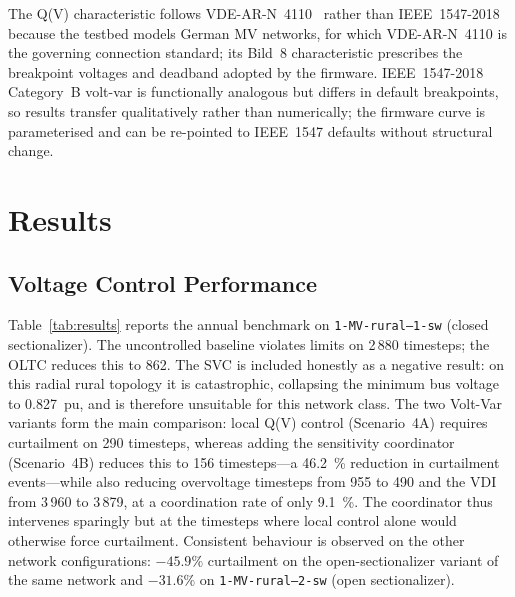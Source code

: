 \documentclass[conference]{IEEEtran}
\begin{document}
The Q(V) characteristic follows VDE-AR-N~4110~\cite{vde4110} rather than
IEEE~1547-2018~\cite{ieee1547} because the testbed models German MV
networks, for which VDE-AR-N~4110 is the governing connection standard;
its Bild~8 characteristic prescribes the breakpoint voltages and
deadband adopted by the firmware. IEEE~1547-2018 Category~B volt-var is
functionally analogous but differs in default breakpoints, so results
transfer qualitatively rather than numerically; the firmware curve is
parameterised and can be re-pointed to IEEE~1547 defaults without
structural change.

\section{Results}
\label{sec:results}

\subsection{Voltage Control Performance}
\label{sec:perf}

Table~\ref{tab:results} reports the annual benchmark on
\texttt{1-MV-rural--1-sw} (closed sectionalizer). The uncontrolled
baseline violates limits on 2\,880 timesteps; the OLTC reduces this to
862. The SVC is included honestly as a negative result: on this radial
rural topology it is catastrophic, collapsing the minimum bus voltage to
0.827~pu, and is therefore unsuitable for this network class. The two
Volt-Var variants form the main comparison: local Q(V) control
(Scenario~4A) requires curtailment on 290 timesteps, whereas adding the
sensitivity coordinator (Scenario~4B) reduces this to 156
timesteps---a \SI{46.2}{\percent} reduction in curtailment
events---while also reducing overvoltage timesteps from 955 to 490 and
the VDI from 3\,960 to 3\,879, at a coordination rate of only
\SI{9.1}{\percent}. The coordinator thus intervenes sparingly but at the
timesteps where local control alone would otherwise force curtailment.
Consistent behaviour is observed on the other network configurations:
$-45.9\%$ curtailment on the open-sectionalizer variant of the same
network and $-31.6\%$ on \texttt{1-MV-rural--2-sw} (open sectionalizer).
\end{document}
